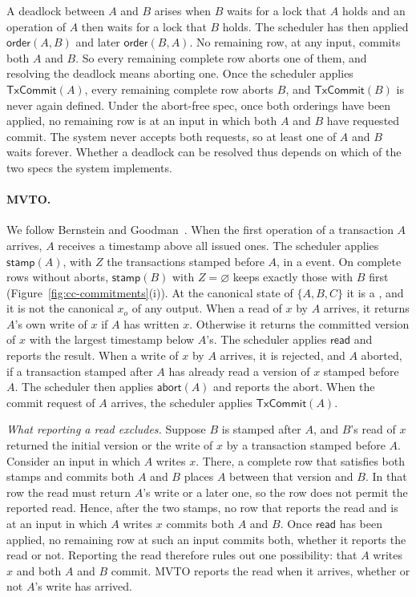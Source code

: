 A deadlock between $A$ and $B$ arises when $B$ waits for a lock that $A$ holds
and an operation of $A$ then waits for a lock that $B$ holds.  The scheduler
has then applied $\mathsf{order}(A,B)$ and later $\mathsf{order}(B,A)$.  No
remaining row, at any input, commits both $A$ and $B$.  So every remaining
complete row aborts one of them, and resolving the deadlock means aborting
one.  Once the scheduler applies $\mathsf{TxCommit}(A)$, every remaining
complete row aborts $B$, and $\mathsf{TxCommit}(B)$ is never again defined.
Under the abort-free spec, once both orderings have been applied, no remaining
row is at an input in which both $A$ and $B$ have requested commit.  The
system never accepts both requests, so at least one of $A$ and $B$ waits
forever.  Whether a deadlock can be resolved thus depends on which of the two
specs the system implements.

\paragraph{MVTO.}
We follow Bernstein and Goodman~\cite{bernstein1981concurrency}.  When the
first operation of a transaction $A$ arrives, $A$ receives a timestamp above
all issued ones.  The scheduler applies $\mathsf{stamp}(A)$, with $Z$ the
transactions stamped before $A$, in a \commitment event.  On complete rows
without aborts, $\mathsf{stamp}(B)$ with $Z=\varnothing$ keeps exactly those
with $B$ first (Figure~\ref{fig:cc-commitments}(i)).  At the canonical state
of $\{A,B,C\}$ it is a \commitment, and it is not the canonical \commitment
$x_o$ of any output.  When a read of $x$ by $A$ arrives, it returns $A$'s own
write of $x$ if $A$ has written $x$.  Otherwise it returns the committed
version of $x$ with the largest timestamp below $A$'s.  The scheduler applies
$\mathsf{read}$ and reports the result.  When a write of $x$ by $A$ arrives,
it is rejected, and $A$ aborted, if a transaction stamped after $A$ has
already read a version of $x$ stamped before $A$.  The scheduler then applies
$\mathsf{abort}(A)$ and reports the abort.  When the commit request of $A$
arrives, the scheduler applies $\mathsf{TxCommit}(A)$.

\emph{What reporting a read excludes.}  Suppose $B$ is stamped after $A$, and
$B$'s read of $x$ returned the initial version or the write of $x$ by a
transaction stamped before $A$.  Consider an input in which $A$ writes $x$.
There, a complete row that satisfies both stamps and commits both $A$ and $B$
places $A$ between that version and $B$.  In that row the read must return
$A$'s write or a later one, so the row does not permit the reported read.
Hence, after the two stamps, no row that reports the read and is at an input
in which $A$ writes $x$ commits both $A$ and $B$.  Once $\mathsf{read}$ has
been applied, no remaining row at such an input commits both, whether it
reports the read or not.  Reporting the read therefore rules out one
possibility: that $A$ writes $x$ and both $A$ and $B$ commit.  MVTO reports
the read when it arrives, whether or not $A$'s write has arrived.

